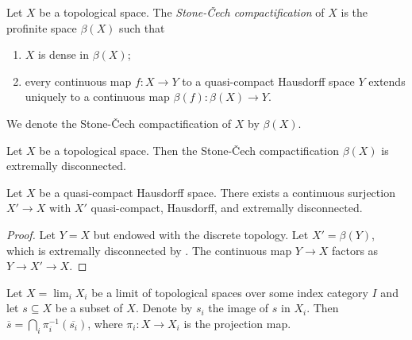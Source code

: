\begin{definition} 
  \label{def:stone-cech-compactification}
  \mathlibok
  Let \(X\) be a topological space. The \emph{Stone-Čech compactification} of \(X\) is the
  profinite space \(\beta(X)\) such that
  \begin{enumerate}
    \item \(X\) is dense in \(\beta(X)\);
    \item every continuous map \(f: X \to Y\) to a quasi-compact Hausdorff space \(Y\)
        extends uniquely to a continuous map \(\beta(f): \beta(X) \to Y\).
  \end{enumerate}
  We denote the Stone-Čech compactification of \(X\) by \(\beta(X)\).
\end{definition}

\begin{theorem}
    Let \(X\) be a topological space. Then the Stone-Čech compactification \(\beta(X)\) is extremally disconnected.
    \label{thm:stone-cech-extremally-disconnected}
    \mathlibok
\end{theorem}

\begin{proposition}
  Let $X$ be a quasi-compact Hausdorff space. There exists a continuous surjection $X' \to X$ with $X'$ quasi-compact, Hausdorff, and extremally disconnected.
  \label{thm:extremally-disconnected-cover}
\end{proposition}

\begin{proof}
  Let $Y=X$ but endowed with the discrete topology. Let $X'=\beta (Y)$, which is extremally disconnected by . The continuous map $Y \to X$ factors as $Y \to X' \to X$.
\end{proof}

\begin{lemma}
  Let $X = \lim_i X_i$ be a limit of topological spaces over some index category \(I\) and let
  $s \subseteq X$ be a subset of \(X\). Denote by $s_i$ the image of $s$ in $X_i$. Then
  $\overline{s} = \bigcap_i \pi_i^{-1} (\overline{s_i})$, where $\pi_i : X \to X_i$ is the projection map.
  \label{lemma:closure-limit-intersection}
  \leanok
\end{lemma}

